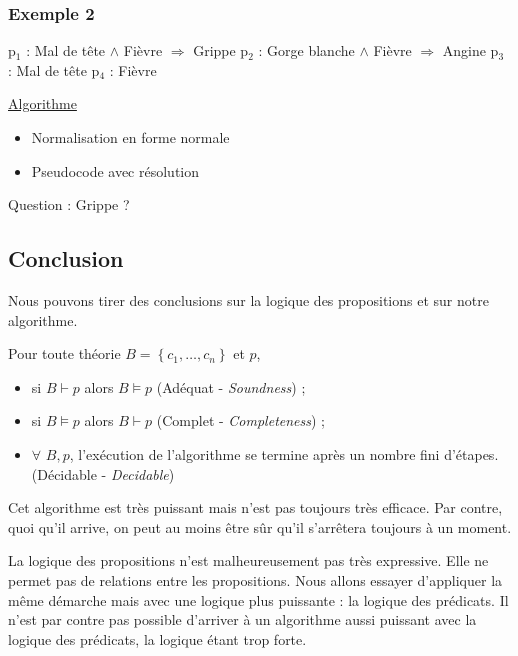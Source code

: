 \subsubsection{Exemple 2}
\noindent p$_{1}$ : Mal de tête $\land$ Fièvre $\Rightarrow$ Grippe \newline
p$_{2}$ : Gorge blanche $\land$ Fièvre $\Rightarrow$ Angine \newline
p$_{3}$ : Mal de tête \newline
p$_{4}$ : Fièvre\newline

\noindent \underline{Algorithme}
\begin{itemize}
\item{Normalisation en forme normale}
\item{Pseudocode avec résolution}
\end{itemize}
Question : Grippe ?

\subsection{Conclusion}
Nous pouvons tirer des conclusions sur la logique des propositions et sur notre algorithme.

Pour toute théorie $B = \left\{c_1, \dots, c_n \right\}$ et $p$,
\begin{itemize}
\item si $B \vdash p$ alors $B \models p$ (Adéquat - \textit{Soundness}) ;
\item si $B \models p$ alors $B \vdash p$ (Complet - \textit{Completeness}) ;
\item $\forall$ $B, p$, l'exécution de l'algorithme se termine après un nombre fini d'étapes. (Décidable - \textit{Decidable})
\end{itemize}

Cet algorithme est très puissant mais n'est pas toujours très efficace. Par contre, quoi qu'il arrive, on peut au moins être sûr qu'il s'arrêtera toujours à un moment.

La logique des propositions n'est malheureusement pas très expressive. Elle ne permet pas de relations entre les propositions. 
Nous allons essayer d'appliquer la même démarche mais avec une logique plus puissante : la logique des prédicats. 
Il n'est par contre pas possible d'arriver à un algorithme aussi puissant avec la logique des prédicats, la logique étant trop forte. 

